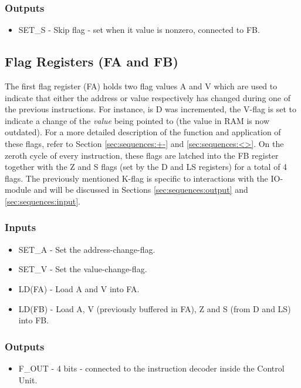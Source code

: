 \subsubsection*{Outputs}
\begin{itemize}
\itemsep0em 
\item SET\_S - Skip flag - set when it value is nonzero, connected to FB.
\end{itemize}

\subsection{Flag Registers (FA and FB)} \label{sec:architecture:flags}
The first flag register (FA) holds two flag values A and V which are used to indicate that either the address or value respectively has changed during one of the previous instructions. For instance, is D was incremented, the V-flag is set to indicate a change of the \emph{value} being pointed to (the value in RAM is now outdated). For a more detailed description of the function and application of these flags, refer to Section \ref{sec:sequences:+-} and \ref{sec:sequences:<>}. On the zeroth cycle of every instruction, these flags are latched into the FB register together with the Z and S flags (set by the D and LS registers) for a total of 4 flags. The previously mentioned K-flag is specific to interactions with the IO-module and will be discussed in Sections \ref{sec:sequences:output} and \ref{sec:sequences:input}.

\subsubsection*{Inputs}
\begin{itemize}
\itemsep0em 
\item SET\_A - Set the address-change-flag.
\item SET\_V - Set the value-change-flag.
\item LD(FA) - Load A and V into FA.
\item LD(FB) - Load A, V (previously buffered in FA), Z and S (from D and LS) into FB. 
\end{itemize}

\subsubsection*{Outputs}
\begin{itemize}
\itemsep0em 
\item F\_OUT - 4 bits - connected to the instruction decoder inside the Control Unit.
\end{itemize}


